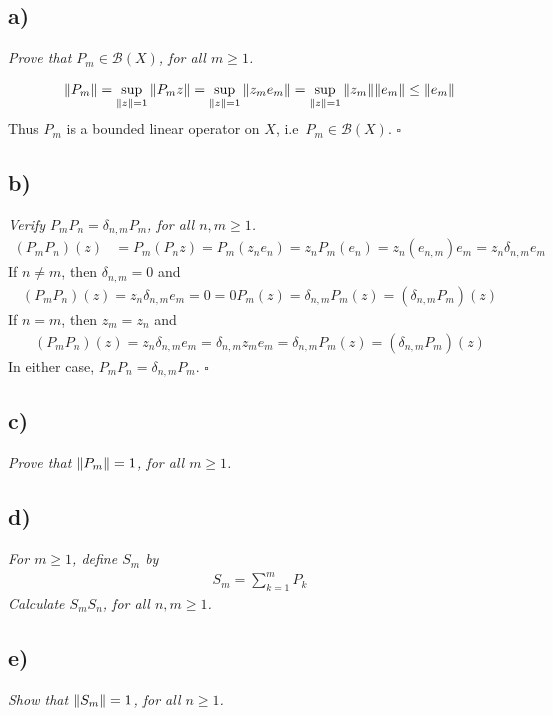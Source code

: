 \documentclass[12pt]{article}
\theoremstyle{plain}
\begin{document}
\subsection*{ a)}
\emph{Prove that $P_m \in \mathcal{B}(X)$, for all $m \geq 1$.}

\begin{align*}
    \norm{P_m} = \sup_{\norm{z}=1}\norm{P_m z} = \sup_{\norm{z}=1}\norm{z_m e_m} = \sup_{\norm{z}=1}\norm{z_m}\norm{e_m} \leq \norm{e_m}
\end{align*}
Thus $P_m$ is a bounded linear operator on $X$, i.e~$P_m \in \mathcal{B}(X)$. \hfill $\square$

\subsection*{ b)}
\emph{Verify $P_m P_n = \delta_{n,m}P_m$, for all $n,m \geq 1$.}
\begin{align*}
    (P_mP_n)(z) &= P_m(P_nz) = P_m(z_ne_n) = z_nP_m(e_n) = z_n(e_{n,m})e_m = z_n\delta_{n,m}e_m
\end{align*}
If $n \neq m$, then $\delta_{n,m} = 0$ and
\begin{align*}
    (P_mP_n)(z) = z_n\delta_{n,m}e_m = 0 = 0P_m(z) = \delta_{n,m}P_m(z) = (\delta_{n,m}P_m)(z)
\end{align*}
If $n = m$, then $z_m = z_n$ and
\begin{align*}
    (P_mP_n)(z) = z_n\delta_{n,m}e_m = \delta_{n,m}z_me_m = \delta_{n,m}P_m(z) = (\delta_{n,m}P_m)(z)
\end{align*}
In either case, $P_mP_n = \delta_{n,m}P_m$. \hfill $\square$

\subsection*{ c)}
\emph{Prove that $\norm{P_m} = 1$, for all $m \geq 1$.} 

\subsection*{ d)}
\emph{For $m \geq 1$, define $S_m$ by}
\begin{align*}
    S_m = \sum_{k=1}^m P_k
\end{align*}
\emph{Calculate $S_m S_n$, for all $n,m \geq 1$.}

\subsection*{ e)}
\emph{Show that $\norm{S_m} = 1$, for all $n \geq 1$.}
\end{document}
